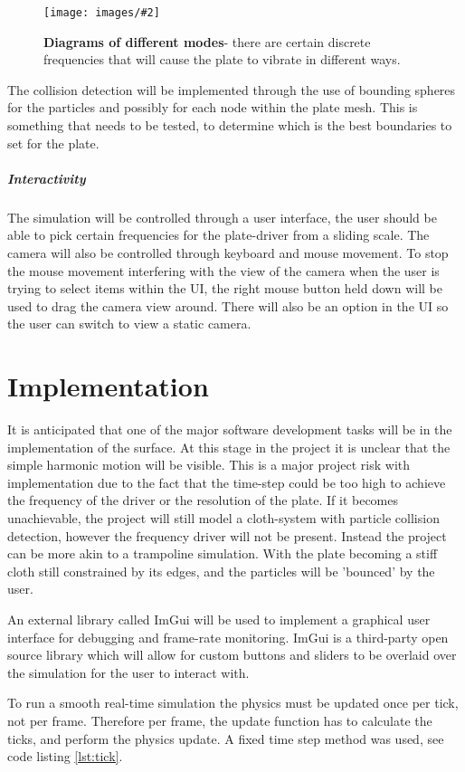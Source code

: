 \documentclass[conference,backref=page]{acmsiggraph}
\newcommand{\figuremacro}[5]{
	\begin{figure}[#1]
		\centering
		\texttt{[image: images/\#2]}
		\caption[#3]{\textbf{#3}#4}
		\label{fig:#2}
	\end{figure}
}
\begin{document}
 \figuremacro{h}{eigen}{Diagrams of different modes}{- there are certain discrete frequencies that will cause the plate to vibrate in different ways. \cite{modes}}{1.0}
 
 The collision detection will be implemented through the use of bounding spheres for the particles and possibly for each node within the plate mesh. This is something that needs to be tested, to determine which is the best boundaries to set for the plate.

\subparagraph{Interactivity}The simulation will be controlled through a user interface, the user should be able to pick certain frequencies for the plate-driver from a sliding scale. The camera will also be controlled through keyboard and mouse movement. To stop the mouse movement interfering with the view of the camera when the user is trying to select items within the UI, the right mouse button held down will be used to drag the camera view around. There will also be an option in the UI so the user can switch to view a static camera.

\section{Implementation}

It is anticipated that one of the major software development tasks will be in the implementation of the surface. At this stage in the project it is unclear that the simple harmonic motion will be visible. This is a major project risk with implementation due to the fact that the time-step could be too high to achieve the frequency of the driver or the resolution of the plate. If it becomes unachievable, the project will still model a cloth-system with particle collision detection, however the frequency driver will not be present. Instead the project can be more akin to a trampoline simulation. With the plate becoming a stiff cloth still constrained by its edges, and the particles will be 'bounced' by the user.

An external library called ImGui \cite{imgui} will be used to implement a graphical user interface for debugging and frame-rate monitoring. ImGui is a third-party open source library which will allow for custom buttons and sliders to be overlaid over the simulation for the user to interact with.



To run a smooth real-time simulation the physics must be updated once per tick, not per frame. Therefore per frame, the update function has to calculate the ticks, and perform the physics update. A fixed time step method was used, see code listing \ref{lst:tick}.
\end{document}

